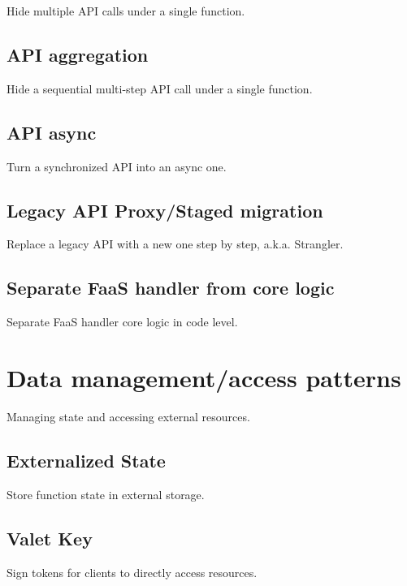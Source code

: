 Hide multiple API calls under a single function.

\subsection{API aggregation} \label{subsubsec:apiAggregation}

Hide a sequential multi-step API call under a single function.

\subsection{API async} \label{subsubsec:apiAsync}

Turn a synchronized API into an async one.

\subsection{Legacy API Proxy/Staged migration} \label{subsubsec:legacyApi}

Replace a legacy API with a new one step by step, a.k.a. Strangler.

\subsection{Separate FaaS handler from core logic} \label
{subsubsec:separateHandler}

Separate FaaS handler core logic in code level.

\section{Data management/access patterns} \label{sec:dataManagementPatterns}

Managing state and accessing external resources.

\subsection{Externalized State} \label{subsubsec:externalizedState}

Store function state in external storage.

\subsection{Valet Key} \label{subsubsec:valetKey}

Sign tokens for clients to directly access resources.

